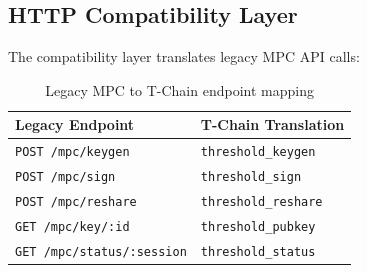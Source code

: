 \subsection{HTTP Compatibility Layer}

The compatibility layer translates legacy MPC API calls:

\begin{table}[h]
\centering
\begin{tabular}{ll}
\toprule
\textbf{Legacy Endpoint} & \textbf{T-Chain Translation} \\
\midrule
\texttt{POST /mpc/keygen} & \texttt{threshold\_keygen} \\
\texttt{POST /mpc/sign} & \texttt{threshold\_sign} \\
\texttt{POST /mpc/reshare} & \texttt{threshold\_reshare} \\
\texttt{GET /mpc/key/:id} & \texttt{threshold\_pubkey} \\
\texttt{GET /mpc/status/:session} & \texttt{threshold\_status} \\
\bottomrule
\end{tabular}
\caption{Legacy MPC to T-Chain endpoint mapping}
\label{tab:compat}
\end{table}


